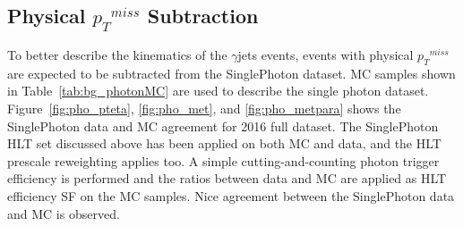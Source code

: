 \subsection{Physical ${p_{T}}^{miss}$ Subtraction}
To better describe the kinematics of the $\gamma$jets events, events with physical ${p_{T}}^{miss}$ are expected to be subtracted from the SinglePhoton dataset. MC samples shown in Table~\ref{tab:bg_photonMC} are used to describe the single photon dataset. Figure~\ref{fig:pho_pteta}, \ref{fig:pho_met}, and \ref{fig:pho_metpara} shows the SinglePhoton data and MC agreement for 2016 full dataset. The SinglePhoton HLT set discussed above has been applied on both MC and data, and the HLT prescale reweighting applies too. A simple cutting-and-counting photon trigger efficiency is performed and the ratios between data and MC are applied as HLT efficiency SF on the MC samples. Nice agreement between the SinglePhoton data and MC is observed.

